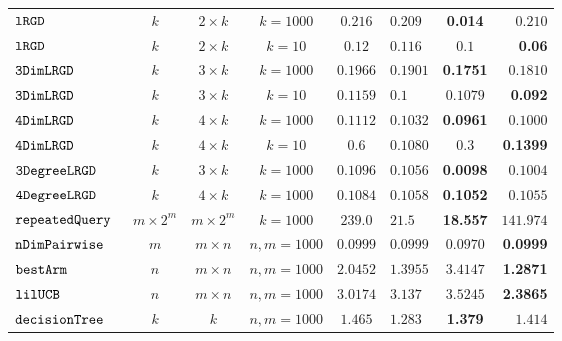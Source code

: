 {\begin {table}[t]
\begin{center}
{\begin{tabular}{|| >{\tiny}l || c | c |c || c || l | c | r ||  }
         \hhline{||-||---||-||---||}
         $  \mathtt{ lRGD }$ & $ k $ & $  2\times k $ & $ k =  1000$  & $0.216$   & $0.209$ & \textbf{0.014} & $0.210$  \\
         \hhline{||-||---||-||---||}
         $  \mathtt{ lRGD }$ & $ k $ & $  2\times k $ & $k =  10$  & $0.12$   & $0.116$ & $ 0.1 $ & \textbf{0.06}  \\
         \hhline{||-||---||-||---||}
         $  \mathtt{ 3DimLRGD }$ & $ k $ & $  3\times k $ & $ k =  1000$  & $0.1966$   & $0.1901$ & \textbf{0.1751} & $0.1810$  \\
         \hhline{||-||---||-||---||}
         $  \mathtt{ 3DimLRGD }$ & $ k $ & $  3\times k $ & $ k =  10$  & $0.1159$   & $0.1$ & $0.1079$ & \textbf{0.092}  \\
         \hhline{||-||---||-||---||}
         $  \mathtt{ 4DimLRGD }$ & $ k $ & $  4\times k $ & $ k =  1000$  & $0.1112$   & $0.1032$ & \textbf{0.0961} & $0.1000$  \\
         \hhline{||-||---||-||---||}
         $  \mathtt{ 4DimLRGD }$ & $ k $ & $  4\times k $ & $ k =  10$  & $0.6$   & $0.1080$ & $0.3 $ & \textbf{0.1399}  \\
         \hhline{||-||---||-||---||}
         $  \mathtt{ 3DegreeLRGD }$ & $ k $ & $  3\times k $ & $ k =  1000$  & $0.1096$   & $0.1056$ & \textbf{0.0098} & $0.1004$  \\
         \hhline{||-||---||-||---||}
         $  \mathtt{ 4DegreeLRGD }$ & $ k $ & $  4\times k $ & $ k =  1000$  & $0.1084$   & $0.1058$ & \textbf{0.1052} & $0.1055$  \\
         \hhline{||-||---||-||---||}
         $\mathtt{repeatedQuery}$~\cite{Jamieson2015TheAO} & $ m \times 2^m $ & $  m \times 2^m $ & $ k =  1000$  & $239.0$   & $21.5$ & {\textbf{18.557}} & $141.974$  \\
         \hhline{||-||---||-||---||}
         $\mathtt{nDimPairwise}$~\cite{Jamieson2015TheAO} & $ m $ & $  m \times n  $ & $ n,m =  1000$  & $0.0999$   & $0.0999$ & $0.0970$ & \textbf{0.0999}  \\
         \hhline{||-||---||-||---||}
         $\mathtt{bestArm}$~\cite{Jamieson2015TheAO} & $ n $ & $  m \times n $ & $ n,m =  1000$  & $ 2.0452$   & $ 1.3955$ & {{$3.4147$}} & \textbf{1.2871}  \\
         \hhline{||-||---||-||---||}
         $\mathtt{lilUCB}$~\cite{Jamieson2015TheAO} & $ n $ & $ m \times n $ & $ n,m =  1000$ & $3.0174$   & $ 3.137$ & {$3.5245$} & \textbf{2.3865}  \\
         \hhline{||-||---||-||---||}
         $\mathtt{decisionTree}$ & $k$ &  $k$ & $ n,m =  1000$ & $ 1.465$  & $ 1.283$ & \textbf{1.379 } & {$1.414$}  \\

\end{tabular}}
\end{center}
\end{table}}
